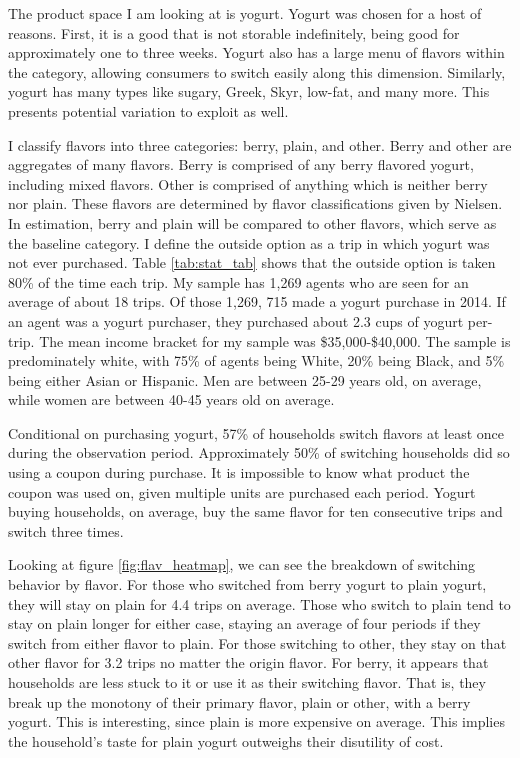 \documentclass[11pt]{article}
\theoremstyle{definition}
\theoremstyle{remark}
\begin{document}
    The product space I am looking at is yogurt. Yogurt was chosen for a host of reasons. First, it is a good that is not storable indefinitely, being good for approximately one to three weeks. Yogurt also has a large menu of flavors within the category, allowing consumers to switch easily along this dimension. Similarly, yogurt has many types like sugary, Greek, Skyr, low-fat, and many more. This presents potential variation to exploit as well.

    I classify flavors into three categories: berry, plain, and other. Berry and other are aggregates of many flavors. Berry is comprised of any berry flavored yogurt, including mixed flavors. Other is comprised of anything which is neither berry nor plain. These flavors are determined by flavor classifications given by Nielsen. In estimation, berry and plain will be compared to other flavors, which serve as the baseline category. I define the outside option as a trip in which yogurt was not ever purchased. Table \ref{tab:stat_tab} shows that the outside option is taken 80\% of the time each trip. My sample has 1,269 agents who are seen for an average of about 18 trips. Of those 1,269, 715 made a yogurt purchase in 2014. If an agent was a yogurt purchaser, they purchased about 2.3 cups of yogurt per-trip. The mean income bracket for my sample was \$35,000-\$40,000. The sample is predominately white, with 75\% of agents being White, 20\% being Black, and 5\% being either Asian or Hispanic. Men are between 25-29 years old, on average, while women are between 40-45 years old on average.

    Conditional on purchasing yogurt, 57\% of households switch flavors at least once during the observation period. Approximately 50\% of switching households did so using a coupon during purchase. It is impossible to know what product the coupon was used on, given multiple units are purchased each period. Yogurt buying households, on average, buy the same flavor for ten consecutive trips and switch three times. 

    Looking at figure \ref{fig:flav_heatmap}, we can see the breakdown of switching behavior by flavor. For those who switched from berry yogurt to plain yogurt, they will stay on plain for 4.4 trips on average. Those who switch to plain tend to stay on plain longer for either case, staying an average of four periods if they switch from either flavor to plain. For those switching to other, they stay on that other flavor for 3.2 trips no matter the origin flavor. For berry, it appears that households are less stuck to it or use it as their switching flavor. That is, they break up the monotony of their primary flavor, plain or other, with a berry yogurt. This is interesting, since plain is more expensive on average. This implies the household's taste for plain yogurt outweighs their disutility of cost. 
\end{document}
